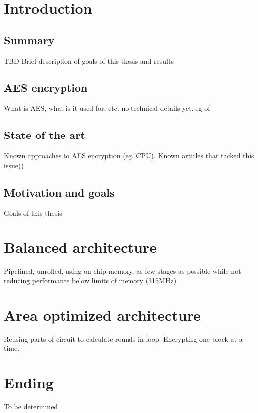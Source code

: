 \documentclass[english,12pt]{../common/aghthesis}
\begin{document}
\maketitle
\tableofcontents
\newpage

\section{Introduction}
\subsection{Summary}
TBD
Brief description of goals of this thesis and results
\subsection{AES encryption}
What is AES, what is it used for, etc. no technical details yet. eg of \cite{saleae-fpga} \cite{netezza-fpga} \cite{nasa-fpga}
\subsection{State of the art}
Known approaches to AES encryption (eg. CPU). Known articles that tacked this issue(\cite{vlsi})
\subsection{Motivation and goals}
Goals of this thesis





% 
% 
% 
% 
% 
	


\section{Balanced architecture}
Pipelined, unrolled, using on chip memory, as few stages as possible while not reducing performance below limits of memory (315MHz)


\section{Area optimized architecture}
Reusing parts of circuit to calculate rounds in loop. Encrypting one block at a time.


\section{Ending}
To be determined




\listoffigures
\lstlistoflistings


\end{document}
